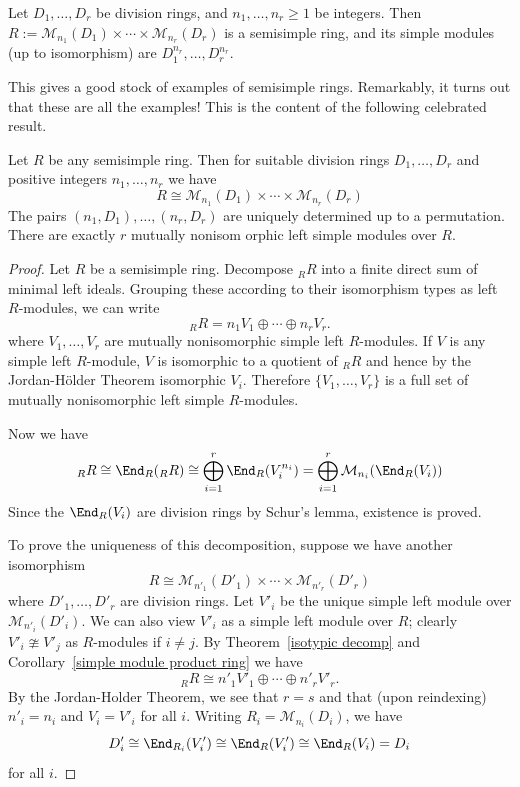 \begin{corollary}
Let $D_1,\dots,D_r$ be division rings, and $n_1,\dots,n_r\geq1$ be integers. Then $R:=\mathcal{M}_{n_1}(D_1)\times\cdots\times\mathcal{M}_{n_r}(D_r)$ is a semisimple ring, and its simple modules (up to isomorphism) are $D_1^{n_r},\dots,D_r^{n_r}$.
\end{corollary}
This gives a good stock of examples of semisimple rings. Remarkably, it turns out that these are all the examples! This is the content of the following celebrated result.
\begin{theorem}\label{Wedderburn-Artin}
Let $R$ be any semisimple ring. Then for suitable division rings $D_1,\dots,D_r$ and positive integers $n_1,\dots,n_r$ we have \[R\cong\mathcal{M}_{n_1}(D_1)\times\cdots\times\mathcal{M}_{n_r}(D_r)\]
The pairs $(n_1,D_1),\dots,(n_r,D_r)$ are uniquely determined up to a permutation. There are exactly $r$ mutually nonisom orphic left simple modules over $R$.
\end{theorem}
\begin{proof}
Let $R$ be a semisimple ring. Decompose $_{R}R$ into a finite direct sum of minimal left ideals. Grouping these according to their isomorphism types as left $R$-modules, we can write
\[_{R}R=n_1V_1\oplus\cdots\oplus n_rV_r.\]
where $V_1,\dots,V_r$ are mutually nonisomorphic simple left $R$-modules. If $V$ is any simple left $R$-module, $V$ is isomorphic to a quotient of $_{R}R$ and hence by the Jordan-H\"older Theorem isomorphic $V_i$. Therefore $\{V_1,\dots,V_r\}$ is a full set of mutually nonisomorphic left simple $R$-modules.\par
Now we have
\[_{R}R\cong\End_R(_{R}R)\cong\bigoplus_{i=1}^{r}\End_R(V_i^{n_i})=\bigoplus_{i=1}^{r}\mathcal{M}_{n_i}(\End_R(V_i))\]
Since the $\End_R(V_i)$ are division rings by Schur's lemma, existence is proved.\par
To prove the uniqueness of this decomposition, suppose we have another
isomorphism
\[R\cong\mathcal{M}_{n'_1}(D'_1)\times\cdots\times\mathcal{M}_{n'_r}(D'_r)\]
where $D'_1,\dots,D'_r$ are division rings. Let $V'_i$ be the unique simple left module over $\mathcal{M}_{n'_i}(D'_i)$. We can also view $V'_i$ as a simple left module over $R$; clearly $V'_i\ncong V'_j$ as $R$-modules if $i\neq j$. By Theorem~\ref{isotypic decomp} and Corollary~\ref{simple module product ring} we have
\[_{R}R\cong n'_1V'_1\oplus\cdots\oplus n'_rV'_r.\]
By the Jordan-Holder Theorem, we see that $r=s$ and that (upon reindexing) $n'_i=n_i$ and $V_i=V'_i$ for all $i$. Writing $R_i=\mathcal{M}_{n_i}(D_i)$, we have
\[D'_i\cong\End_{R_i}(V'_i)\cong\End_{R}(V'_i)\cong\End_{R}(V_i)=D_i\]
for all $i$.
\end{proof}
